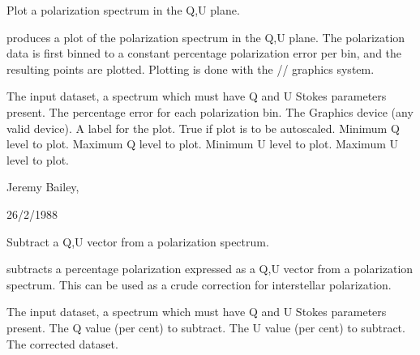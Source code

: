 \begin{manroutinedescription}
        Plot a polarization spectrum in the Q,U plane.

        {} produces a plot of the polarization spectrum in the
        Q,U plane. The polarization data is first binned to a constant
        percentage polarization error per bin, and the resulting points
        are plotted. Plotting is done with the {}/{}/{%
} graphics system.

\begin{manparametertable}
  The input %
dataset, a spectrum which must
                               have Q and U Stokes parameters present.
     The percentage error for %
each polarization
                               bin.
   The Graphics device (any %
valid {} device).
     A label for the plot.
  True if plot is to be autoscaled.
     Minimum Q level to plot.
     Maximum Q level to plot.
     Minimum U level to plot.
     Maximum U level to plot.

\end{manparametertable}
         Jeremy Bailey, {}

         26/2/1988

\end{manroutinedescription}
\begin{manroutinedescription}
        Subtract a Q,U vector from a polarization spectrum.

        {} subtracts a percentage polarization expressed as a Q,U
        vector from a polarization spectrum. This can be used as a
        crude correction for interstellar polarization.

\begin{manparametertable}
  The input %
dataset, a spectrum which must
                               have Q and U Stokes parameters present.
     The Q value (per cent) to %
subtract.
     The U value (per cent) to %
subtract.
  The %
corrected dataset.

\end{manparametertable}
\end{manroutinedescription}
